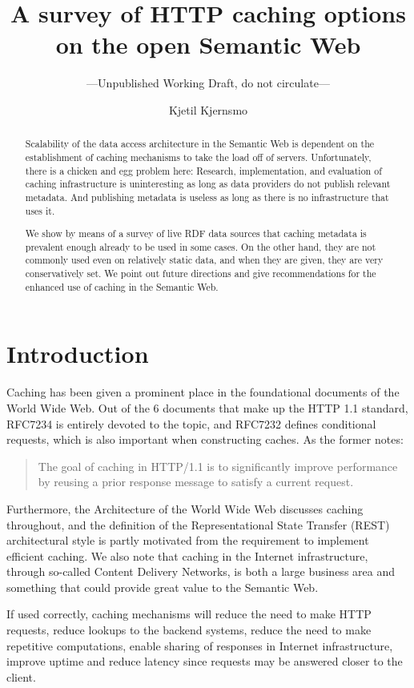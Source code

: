 \documentclass{llncs}
\title{A survey of HTTP caching options on the open Semantic Web}
\author{Kjetil Kjernsmo}
\institute{Department of Informatics,
Postboks 1080 Blindern,
N-0316 Oslo, Norway \email{kjetil@kjernsmo.net}}
\subtitle{---Unpublished Working Draft, do not circulate---}
\begin{document}
\maketitle

\begin{abstract}
Scalability of the data access architecture in the Semantic Web is
dependent on the establishment of caching mechanisms to take the load
off of servers.  Unfortunately, there is a chicken and egg problem
here: Research, implementation, and evaluation of caching
infrastructure is uninteresting as long as data providers do not
publish relevant metadata.  And publishing metadata is useless as long
as there is no infrastructure that uses it.

We show by means of a survey of live RDF data sources that caching
metadata is prevalent enough already to be used in some cases.  On the
other hand, they are not commonly used even on relatively static data,
and when they are given, they are very conservatively set. We point
out future directions and give recommendations for the enhanced use of
caching in the Semantic Web.
\end{abstract}

\section{Introduction}

Caching has been given a prominent place in the foundational documents
of the World Wide Web. Out of the 6 documents that make up the HTTP
1.1 standard, RFC7234 \cite{rfc7234} is entirely devoted to the topic,
and RFC7232 \cite{rfc7232} defines conditional requests, which is also
important when constructing caches. As the former notes:
\begin{quote} 
  The goal of caching in HTTP/1.1 is to significantly improve
  performance by reusing a prior response message to satisfy a current
  request.
\end{quote}
Furthermore, the Architecture of the World Wide Web
\cite{Jacobs:04:AWW} discusses caching throughout, and the definition
of the Representational State Transfer (REST) architectural style
\cite{Fielding_2000_Architectural-Styles} is partly motivated from the
requirement to implement efficient caching. We also note that caching
in the Internet infrastructure, through so-called Content Delivery
Networks, is both a large business area and something that could
provide great value to the Semantic Web.

If used correctly, caching mechanisms will reduce the need to make
HTTP requests, reduce lookups to the backend systems, reduce the need
to make repetitive computations, enable sharing of responses in
Internet infrastructure, improve uptime and reduce latency since
requests may be answered closer to the client.
\end{document}
